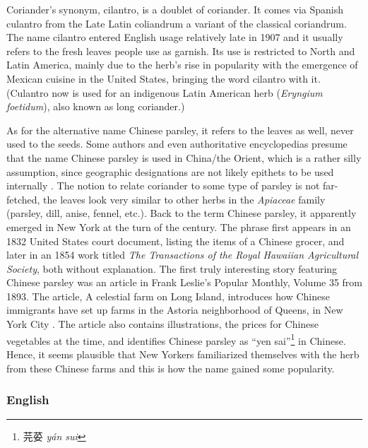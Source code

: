Coriander’s synonym, cilantro, is a doublet of coriander. It comes via Spanish culantro from the Late Latin coliandrum a variant of the classical coriandrum. The name cilantro entered English usage relatively late in 1907 \autocite{harper_coriander_nodate} and it usually refers to the fresh leaves people use as garnish. Its use is restricted to North and Latin America, mainly due to the herb’s rise in popularity with the emergence of Mexican cuisine in the United States, bringing the word cilantro with it. (Culantro now is used for an indigenous Latin American herb (\textit{Eryngium foetidum}), also known as long coriander.)

As for the alternative name Chinese parsley, it refers to the leaves as well, never used to the seeds. Some authors and even authoritative encyclopedias presume that the name Chinese parsley is used in China/the Orient, which is a rather silly assumption, since geographic designations are not likely epithets to be used internally \autocite[cf.][]{davidson_oxford_2014, oconnell_book_2016}. The notion to relate coriander to some type of parsley is not far-fetched, the leaves look very similar to other herbs in the \textit{Apiaceae} family (parsley, dill, anise, fennel, etc.). Back to the term Chinese parsley, it apparently emerged in New York at the turn of the century. The phrase first appears in an 1832 United States court document, listing the items of a Chinese grocer, and later in an 1854 work titled \textit{The Transactions of the Royal Hawaiian Agricultural Society}, both without explanation. The first truly interesting story featuring Chinese parsley was an article in Frank Leslie's Popular Monthly, Volume 35 from 1893. The article, A celestial farm on Long Island, introduces how Chinese immigrants have set up farms in the Astoria neighborhood of Queens, in New York City \autocite{seitz_celestial_1893} . The article also contains illustrations, the prices for Chinese vegetables at the time, and identifies Chinese parsley as ``yen sai''\footnote{芫荽 \textit{yán sui}} in Chinese. Hence, it seems plausible that New Yorkers familiarized themselves with the herb from these Chinese farms and this is how the name gained some popularity.



\subsubsection{English}



